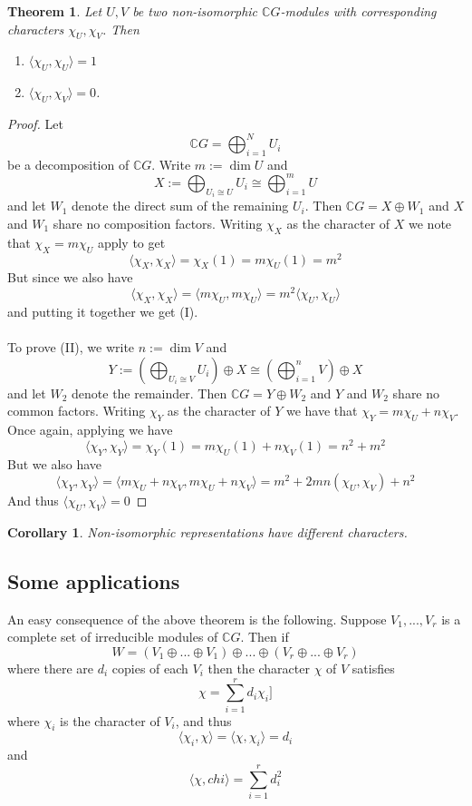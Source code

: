 \documentclass[11pt, notitlepage]{article}
\numberwithin{equation}{section}
\theoremstyle{plain}
\newtheorem{theorem}{Theorem}[section]
\newtheorem{corollary}{Corollary}[theorem]
\theoremstyle{definition}
\newcommand{\CG}{{\mathbb{C}G}}
\begin{document}
\begin{theorem}
	Let $U, V$ be two non-isomorphic $\CG$-modules with corresponding characters $\chi_U, \chi_V$. Then 
	\begin{enumerate}[label=\emph{(\Roman*)}]
		\item $\langle \chi_U, \chi_U \rangle = 1$
		\item $\langle \chi_U, \chi_V \rangle = 0$.
	\end{enumerate} 
\end{theorem}
\begin{proof}
	Let \[\CG = \bigoplus_{i = 1}^N U_i \] be a decomposition of $\CG$. Write $m:= \dim U$ and \[X:= \bigoplus_{U_i \cong U} U_i \cong \bigoplus_{i = 1}^{m} U\] and let $W_1$ denote the direct sum of the remaining $U_i$. Then $\CG = X \oplus W_1$ and $X$ and $W_1$ share no composition factors. Writing $\chi_X$ as the character of $X$ we note that $\chi_X = m\chi_U$ apply  to get \[ \langle \chi_X, \chi_X \rangle = \chi_X(1) = m \chi_U(1) = m^2\] But since we also have \[\langle \chi_X, \chi_X \rangle = \langle m\chi_U, m\chi_U \rangle = m^2 \langle \chi_U, \chi_U \rangle \] and putting it together we get (I).
	\\\\
	To prove (II), we write $n:= \dim V$ and \[Y:= \left(\bigoplus_{U_i \cong V} U_i\right)\oplus X \cong\left(\bigoplus_{i = 1}^{n} V\right) \oplus X \] and let $W_2$ denote the remainder. Then $\CG = Y \oplus W_2$ and $Y$ and $W_2$ share no common factors. Writing $\chi_Y$ as the character of $Y$ we have that $\chi_Y = m \chi_U + n \chi_V$. Once again, applying  we have \[ \langle \chi_Y, \chi_Y \rangle = \chi_Y(1) = m\chi_U(1) + n\chi_V(1) = n^2 + m^2\] But we also have \[ \langle \chi_Y, \chi_Y \rangle = \langle m\chi_U + n\chi_V, m\chi_U + n\chi_V \rangle = m^2  + 2mn(\chi_U, \chi_V) + n^2  \] And thus $ \langle \chi_U, \chi_V \rangle = 0$
\end{proof}
\begin{corollary}
	Non-isomorphic representations have different characters.
\end{corollary}

\subsection{Some applications}

An easy consequence of the above theorem is the following. Suppose $V_1,...,V_r$ is a complete set of irreducible modules of $\CG$. Then if \[W = (V_1\oplus...\oplus V_1) \oplus ...\oplus (V_r\oplus ... \oplus V_r)\] where there are $d_i$ copies of each $V_i$ then the character $\chi$ of $V$ satisfies \[\chi = \sum_{i = 1}^r d_i \chi_i]\] where $\chi_i$ is the character of $V_i$, and thus $$ \langle \chi_i, \chi \rangle = \langle \chi, \chi_i \rangle = d_i$$ and $$\langle \chi, chi \rangle = \sum_{i = 1}^r d_i ^2$$
\end{document}
